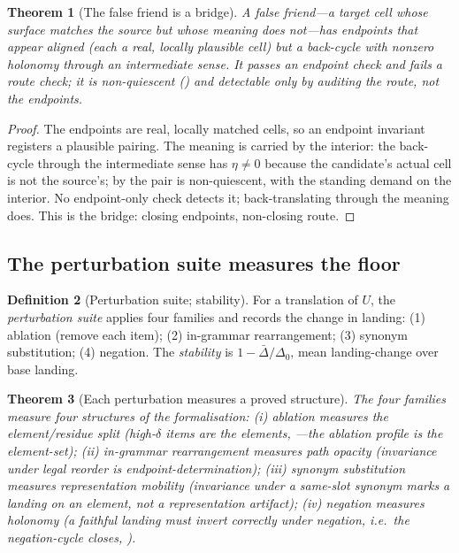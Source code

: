\documentclass[11pt,a4paper]{article}
\theoremstyle{thmstyle}
\newtheorem{theorem}{Theorem}[section]
\theoremstyle{definition}
\newtheorem{definition}[theorem]{Definition}
\theoremstyle{remark}
\newcommand{\hol}{\eta}                %
\newcommand{\abl}{\delta}              %
\begin{document}
\begin{theorem}[The false friend is a bridge]
\label{thm:falsefriend}
A \emph{false friend}---a target cell whose surface matches the source but
whose meaning does not---has \emph{endpoints} that appear aligned (each a
real, locally plausible cell) but a \emph{back-cycle} with nonzero holonomy
through an intermediate sense. It passes an endpoint check and fails a route
check; it is non-quiescent () and detectable only by
auditing the route, not the endpoints.
\end{theorem}

\begin{proof}
The endpoints are real, locally matched cells, so an endpoint invariant
registers a plausible pairing. The meaning is carried by the interior: the
back-cycle through the intermediate sense has $\hol\neq0$ because the
candidate's actual cell is not the source's; by  the pair
is non-quiescent, with the standing demand on the interior. No endpoint-only
check detects it; back-translating through the meaning does. This is the
bridge: closing endpoints, non-closing route.
\end{proof}

\subsection{The perturbation suite measures the floor}

\begin{definition}[Perturbation suite; stability]
\label{def:perturb}
For a translation of $U$, the \emph{perturbation suite} applies four families
and records the change in landing: \textup{(1)} ablation (remove each item);
\textup{(2)} in-grammar rearrangement; \textup{(3)} synonym substitution;
\textup{(4)} negation. The \emph{stability} is $1-\bar{\Delta}/\Delta_0$,
mean landing-change over base landing.
\end{definition}

\begin{theorem}[Each perturbation measures a proved structure]
\label{thm:perturb}
The four families measure four structures of the formalisation:
\textup{(i)} ablation measures the element/residue split (high-$\abl$ items
are the elements, ---the ablation profile \emph{is}
the element-set); \textup{(ii)} in-grammar rearrangement measures path opacity
(invariance under legal reorder is endpoint-determination); \textup{(iii)}
synonym substitution measures representation mobility (invariance under a
same-slot synonym marks a landing on an element, not a representation
artifact); \textup{(iv)} negation measures holonomy (a faithful landing must
invert correctly under negation, i.e.\ the negation-cycle closes,
).
\end{theorem}
\end{document}
